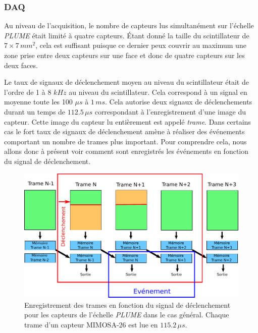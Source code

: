   \subsubsection{DAQ}

  Au niveau de l'acquisition, le nombre de capteurs lus simultan\'ement sur l'\'echelle \textit{PLUME} \'etait limit\'e \`a quatre capteurs. \'Etant donn\'e la taille du scintillateur de $7 \times 7 \, mm^2$, cela est suffisant puisque ce dernier peux couvrir au maximum une zone prise entre deux capteurs sur une face et donc de quatre capteurs sur les deux faces.
 
  \medskip
 
  Le taux de signaux de d\'eclenchement moyen au niveau du scintillateur \'etait de l'ordre de 1 \`a 8 $kHz$ au niveau du scintillateur. Cela correspond \`a un signal en moyenne toute les 100 $\mu s$ \`a $1 \, ms$. Cela autorise deux signaux de d\'eclenchements durant un temps de $112.5 \, \mu s$ correspondant \`a l'enregistrement d'une image du capteur. Cette image du capteur lu enti\`erement est appel\'e \textit{trame}. Dans certains cas le fort taux de signaux de d\'eclenchement am\`ene \`a r\'ealiser des \'ev\'enements comportant un nombre de trames plus important. Pour comprendre cela, nous allons donc \`a pr\'esent voir comment sont enregistr\'es les \'ev\'enements en fonction du signal de d\'eclenchement.
  
   \begin{figure}[!htb]
    \begin{center} 
     \includegraphics[scale=0.8]{./figures/lecture_Mi26_PLUME.pdf}
     \caption{Enregistrement des trames en fonction du signal de d\'eclenchement pour les capteurs de l'\'echelle \textit{PLUME} dans le cas g\'en\'eral. Chaque trame d'un capteur MIMOSA-26 est lue en $115.2 \, \mu s$.}
     \label{fig:1triggerFrames}
    \end{center}
   \end{figure}
  
